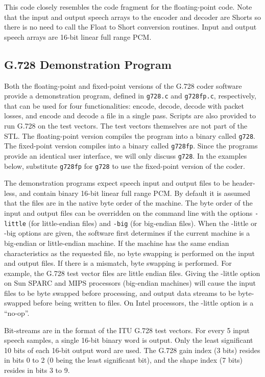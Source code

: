 This code closely resembles the code fragment for the floating-point code.
Note that the input and output speech arrays to the encoder and decoder
are Shorts so there is no need to call the Float to Short conversion routines.
Input and output speech arrays are 16-bit linear full range PCM.

\subsection {G.728 Demonstration Program}

Both the floating-point and fixed-point versions of the G.728 coder
software provide a demonstration program, defined in {\tt g728.c} and
{\tt g728fp.c}, respectively, that can be used for four
functionalities: encode, decode, decode with packet losses, and encode
and decode a file in a single pass. Scripts are also provided to run
G.728 on the test vectors. The test vectors themselves are not part of
the STL. The floating-point version compiles the program into a binary
called {\tt g728}. The fixed-point version compiles into a binary
called {\tt g728fp}. Since the programs provide an identical user
interface, we will only discuss {\tt g728}. In the examples below,
substitute {\tt g728fp} for {\tt g728} to use the fixed-point version
of the coder.

The demonstration programs expect speech input and output files to be
header-less, and contain binary 16-bit linear full range PCM.  By
default it is assumed that the files are in the native byte order of
the machine. The byte order of the input and output files can be
overridden on the command line with the options {\tt -little} (for
little-endian files) and {\tt -big} (for big-endian files).  When the
-little or -big options are given, the software first determines if
the current machine is a big-endian or little-endian machine.  If the
machine has the same endian characteristics as the requested file, no
byte swapping is performed on the input and output files. If there is
a mismatch, byte swapping is performed. For example, the G.728 test
vector files are little endian files. Giving the -little option on Sun
SPARC and MIPS processors (big-endian machines) will cause the input
files to be byte swapped before processing, and output data streams to
be byte-swapped before being written to files. On Intel processors,
the -little option is a ``no-op''.

Bit-streams are in the format of the ITU G.728 test vectors. For every 5 input
speech samples, a single 16-bit binary word is output. Only the least
significant 10 bits of each 16-bit output word are used.
The G.728 gain index (3 bits) resides in bits 0 to 2 (0 being the least
significant bit), and the shape index (7 bits) resides in bits 3 to 9.

